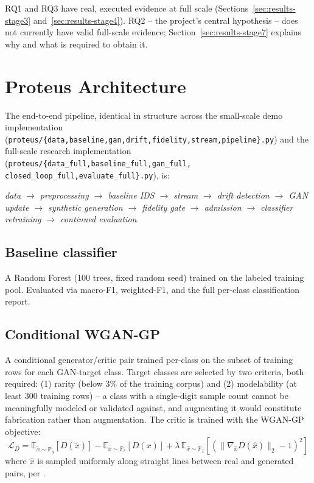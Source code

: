 \documentclass[conference]{IEEEtran}
\begin{document}
RQ1 and RQ3 have real, executed evidence at full scale (Sections~\ref{sec:results-stage3}
and~\ref{sec:results-stage4}). RQ2 -- the project's central hypothesis -- does not currently have
valid full-scale evidence; Section~\ref{sec:results-stage7} explains why and what is required to
obtain it.

\section{Proteus Architecture}

The end-to-end pipeline, identical in structure across the small-scale demo implementation
(\texttt{proteus/\{data,baseline,gan,drift,fidelity,stream,pipeline\}.py}) and the full-scale
research implementation (\texttt{proteus/\{data\_full,baseline\_full,gan\_full,
closed\_loop\_full,evaluate\_full\}.py}), is:

\begin{center}
\textit{data $\rightarrow$ preprocessing $\rightarrow$ baseline IDS $\rightarrow$ stream
$\rightarrow$ drift detection $\rightarrow$ GAN update $\rightarrow$ synthetic generation
$\rightarrow$ fidelity gate $\rightarrow$ admission $\rightarrow$ classifier retraining
$\rightarrow$ continued evaluation}
\end{center}

\subsection{Baseline classifier}
A Random Forest (100 trees, fixed random seed) trained on the labeled training pool. Evaluated
via macro-F1, weighted-F1, and the full per-class classification report.

\subsection{Conditional WGAN-GP}
A conditional generator/critic pair trained per-class on the subset of training rows for each
GAN-target class. Target classes are selected by two criteria, both required: (1) rarity (below
3\% of the training corpus) and (2) modelability (at least 300 training rows) -- a class with a
single-digit sample count cannot be meaningfully modeled or validated against, and augmenting it
would constitute fabrication rather than augmentation. The critic is trained with the WGAN-GP
objective:
\begin{equation}
  \mathcal{L}_D = \mathbb{E}_{\tilde{x}\sim \mathbb{P}_g}[D(\tilde{x})] -
  \mathbb{E}_{x\sim \mathbb{P}_r}[D(x)] +
  \lambda\, \mathbb{E}_{\hat{x}\sim \mathbb{P}_{\hat{x}}}\left[(\lVert\nabla_{\hat{x}}
  D(\hat{x})\rVert_2 - 1)^2\right]
\end{equation}
where $\hat{x}$ is sampled uniformly along straight lines between real and generated pairs, per
\cite{gulrajani2017}.
\end{document}
